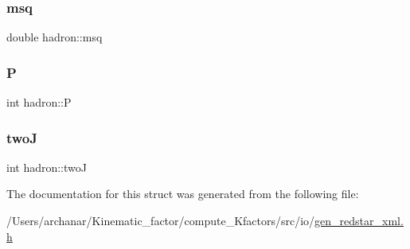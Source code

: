 \subsubsection{\texorpdfstring{msq}{msq}}
{\footnotesize\ttfamily double hadron\+::msq}

\mbox{\label{structhadron_a317d83c6257a8452f70b2251ec784715}} 
\subsubsection{\texorpdfstring{P}{P}}
{\footnotesize\ttfamily int hadron\+::P}

\mbox{\label{structhadron_ae190a1452b80921c1fc32bbfb805ae9d}} 
\subsubsection{\texorpdfstring{twoJ}{twoJ}}
{\footnotesize\ttfamily int hadron\+::twoJ}



The documentation for this struct was generated from the following file\+:\begin{DoxyCompactItemize}
\item 
/\+Users/archanar/\+Kinematic\+\_\+factor/compute\+\_\+\+Kfactors/src/io/\mbox{\hyperlink{gen__redstar__xml_8h}{gen\+\_\+redstar\+\_\+xml.\+h}}\end{DoxyCompactItemize}
